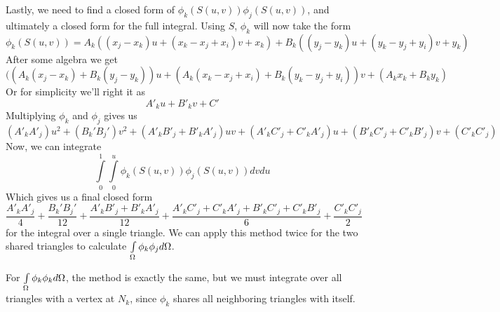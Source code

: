 Lastly, we need to find a closed form of $\phi_k(S(u,v))\phi_j(S(u,v))$, and ultimately a closed form for the full
integral. Using $S$, $\phi_k$ will now take the form
\begin{equation}
\phi_k(S(u,v)) = A_k ((x_j - x_k)u + (x_k - x_j + x_i)v + x_k) + B_k((y_j - y_k)u + (y_k - y_j + y_i)v + y_k)
\end{equation}
After some algebra we get
\begin{equation}
((A_k(x_j-x_k) + B_k(y_j-y_k))u + (A_k(x_k-x_j+x_i) + B_k(y_k-y_j+y_i))v + (A_k x_k + B_k y_k)
\end{equation}
Or for simplicity we'll right it as
\begin{equation}
A'_k u + B'_k v + C'
\end{equation}
Multiplying $\phi_k$ and $\phi_j$ gives us
\begin{equation}
(A'_k A'_j)u^2 + (B_k'B_j')v^2 + (A'_k B'_j + B'_k A'_j)uv + (A'_k C'_j + C'_k A'_j)u
+ (B'_kC'_j + C'_kB'_j)v + (C'_k C'_j)
\end{equation}
Now, we can integrate
\begin{equation}
\int\limits_0^1\int\limits_0^u \phi_k(S(u,v)) \phi_j(S(u,v)) dvdu
\end{equation}
Which gives us a final closed form
\begin{equation}
\frac{A'_k A'_j}{4} + \frac{B_k'B_j'}{12} + \frac{A'_k B'_j + B'_k A'_j}{12} +
\frac{A'_k C'_j + C'_k A'_j + B'_kC'_j + C'_kB'_j}{6} + \frac{C'_k C'_j}{2}
\end{equation}
for the integral over a single triangle. We can apply this method twice for the two shared triangles to calculate
$\int\limits_{\Omega} \phi_k \phi_j d\Omega$.

For $\int\limits_{\Omega} \phi_k \phi_k d\Omega$, the method is exactly the same, but we must integrate over all triangles with a
vertex at $N_k$, since $\phi_k$ shares all neighboring triangles with itself.
